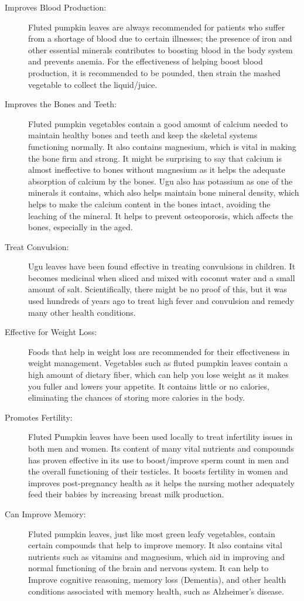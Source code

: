 \begin{description}
	\item[Improves Blood Production:] Fluted pumpkin leaves are always recommended for patients who suffer from a shortage of blood due to certain illnesses; the presence of iron and other essential minerals contributes to boosting blood in the body system and prevents anemia. For the effectiveness of helping boost blood production, it is recommended to be pounded, then strain the mashed vegetable to collect the liquid/juice.
	
	\item[Improves the Bones and Teeth:] Fluted pumpkin vegetables contain a good amount of calcium needed to maintain healthy bones and teeth and keep the skeletal systems functioning normally. It also contains magnesium, which is vital in making the bone firm and strong. It might be surprising to say that calcium is almost ineffective to bones without magnesium as it helps the adequate absorption of calcium by the bones. Ugu also has potassium as one of the minerals it contains, which also helps maintain bone mineral density, which helps to make the calcium content in the bones intact, avoiding the leaching of the mineral. It helps to prevent osteoporosis, which affects the bones, especially in the aged.
	
	\item[Treat Convulsion:] Ugu leaves have been found effective in treating convulsions in children. It becomes medicinal when sliced and mixed with coconut water and a small amount of salt. Scientifically, there might be no proof of this, but it was used hundreds of years ago to treat high fever and convulsion and remedy many other health conditions.
	
	\item[Effective for Weight Loss:] Foods that help in weight loss are recommended for their effectiveness in weight management. Vegetables such as fluted pumpkin leaves contain a high amount of dietary fiber, which can help you lose weight as it makes you fuller and lowers your appetite. It contains little or no calories, eliminating the chances of storing more calories in the body.
	
	\item[Promotes Fertility:] Fluted Pumpkin leaves have been used locally to treat infertility issues in both men and women. Its content of many vital nutrients and compounds has proven effective in its use to boost/improve sperm count in men and the overall functioning of their testicles. It boosts fertility in women and improves post-pregnancy health as it helps the nursing mother adequately feed their babies by increasing breast milk production.
	
	\item[Can Improve Memory:] Fluted pumpkin leaves, just like most green leafy vegetables, contain certain compounds that help to improve memory. It also contains vital nutrients such as vitamins and magnesium, which aid in improving and normal functioning of the brain and nervous system. It can help to Improve cognitive reasoning, memory loss (Dementia), and other health conditions associated with memory health, such as Alzheimer’s disease.	
\end{description}

